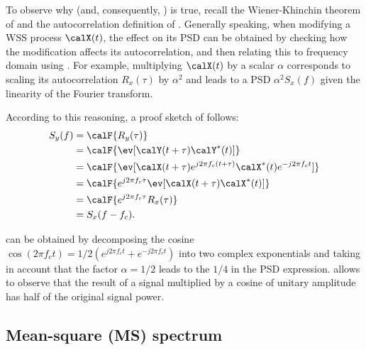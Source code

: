 To observe why  (and, consequently, ) is true, recall the Wiener-Khinchin theorem of  and the autocorrelation definition of
. Generally speaking, when modifying a WSS process $\calX(t)$, the effect on its PSD can be obtained by checking how the modification affects its autocorrelation, and then relating this to frequency domain using . For example, multiplying $\calX(t)$ by a scalar $\alpha$ corresponds to scaling its autocorrelation $R_x(\tau)$ by $\alpha^2$ and leads to a PSD $\alpha^2 S_x(f)$ given the linearity of the Fourier transform.

According to this reasoning, a proof sketch of  follows:
\begin{align*}
S_y(f) &= \calF \{ R_y(\tau) \} \\
 &= \calF \{ \ev[\calY(t+\tau) \calY^*(t)] \} \\
 &= \calF \{ \ev[\calX(t+\tau)e^{j 2 \pi f_c (t+\tau)} \calX^*(t) e^{-j 2 \pi f_c t}] \} \\
 &= \calF \{ e^{j 2 \pi f_c \tau} \ev[\calX(t+\tau) \calX^*(t)] \} \\
 &= \calF \{ e^{j 2 \pi f_c \tau} R_x(\tau) \} \\
 &= S_x(f-f_c).
\end{align*}

 can be obtained by decomposing the cosine $\cos(2\pi f_c t )=1/2(e^{j2\pi f_c t}+e^{-j2\pi f_c t})$ into two complex exponentials and taking in account that the factor $\alpha=1/2$ leads to the $1/4$ in the PSD expression.
 allows to observe that the result of a signal multiplied by a cosine of unitary amplitude has half of the original signal power.


\subsection{Mean-square (MS) spectrum}



